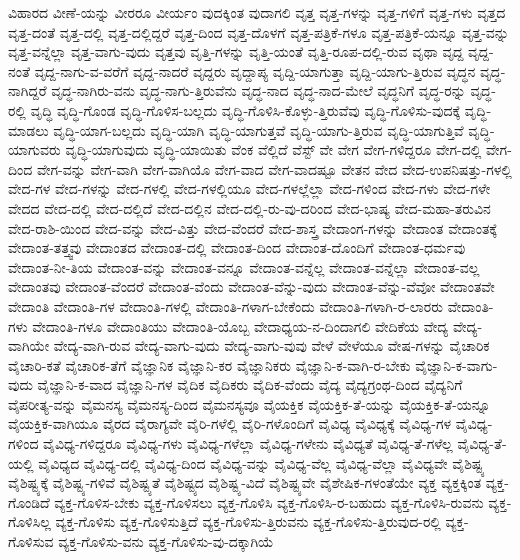 {ವಿಹಾರದ
ವೀಣೆ-ಯನ್ನು
ವೀರರೂ
ವೀರ್ಯಂ
ವುದಕ್ಕಿಂತ
ವುದಾಗಲಿ
ವೃತ್ತ
ವೃತ್ತ-ಗಳನ್ನು
ವೃತ್ತ-ಗಳಿಗೆ
ವೃತ್ತ-ಗಳು
ವೃತ್ತದ
ವೃತ್ತ-ದಂತೆ
ವೃತ್ತ-ದಲ್ಲಿ
ವೃತ್ತ-ದಲ್ಲಿದ್ದರೆ
ವೃತ್ತ-ದಿಂದ
ವೃತ್ತ-ದೊಳಗೆ
ವೃತ್ತ-ಪತ್ರಿಕೆ-ಗಳೂ
ವೃತ್ತ-ಪತ್ರಿಕೆ-ಯನ್ನೂ
ವೃತ್ತ-ವನ್ನು
ವೃತ್ತ-ವನ್ನೆಲ್ಲಾ
ವೃತ್ತ-ವಾಗು-ವುದು
ವೃತ್ತವು
ವೃತ್ತಿ-ಗಳನ್ನು
ವೃತ್ತಿ-ಯಂತೆ
ವೃತ್ತಿ-ರೂಪ-ದಲ್ಲಿ-ರುವ
ವೃಥಾ
ವೃದ್ದ
ವೃದ್ದ-ನಂತೆ
ವೃದ್ದ-ನಾಗು-ವ-ವರೆಗೆ
ವೃದ್ದ-ನಾದರೆ
ವೃದ್ದರು
ವೃದ್ದಾಪ್ಯ
ವೃದ್ದಿ-ಯಾಗುತ್ತಾ
ವೃದ್ದಿ-ಯಾಗು-ತ್ತಿರುವ
ವೃದ್ಧನ
ವೃದ್ಧ-ನಾಗಿದ್ದರೆ
ವೃದ್ಧ-ನಾಗಿರು-ವನು
ವೃದ್ಧ-ನಾಗು-ತ್ತಿರುವೆನು
ವೃದ್ಧ-ನಾದ
ವೃದ್ಧ-ನಾದ-ಮೇಲೆ
ವೃದ್ಧನಿಗೆ
ವೃದ್ಧ-ರನ್ನು
ವೃದ್ಧ-ರಲ್ಲಿ
ವೃದ್ಧಿ
ವೃದ್ಧಿ-ಗೊಂಡ
ವೃದ್ಧಿ-ಗೊಳಿಸ-ಬಲ್ಲದು
ವೃದ್ಧಿ-ಗೊಳಿಸಿ-ಕೊಳ್ಳು-ತ್ತಿರುವೆವು
ವೃದ್ಧಿ-ಗೊಳಿಸು-ವುದಕ್ಕೆ
ವೃದ್ಧಿ-ಮಾಡಲು
ವೃದ್ಧಿ-ಯಾಗ-ಬಲ್ಲದು
ವೃದ್ಧಿ-ಯಾಗಿ
ವೃದ್ಧಿ-ಯಾಗುತ್ತವೆ
ವೃದ್ಧಿ-ಯಾಗು-ತ್ತಿರುವ
ವೃದ್ಧಿ-ಯಾಗುತ್ತಿವೆ
ವೃದ್ಧಿ-ಯಾಗುವರು
ವೃದ್ಧಿ-ಯಾಗುವುದು
ವೃದ್ಧಿ-ಯಾಯಿತು
ವೆಂಕ
ವೆಲ್ಲಿದೆ
ವೆಸ್ಟ್
ವೇ
ವೇಗ
ವೇಗ-ಗಳಿದ್ದರೂ
ವೇಗ-ದಲ್ಲಿ
ವೇಗ-ದಿಂದ
ವೇಗ-ವನ್ನು
ವೇಗ-ವಾಗಿ
ವೇಗ-ವಾಗಿಯೊ
ವೇಗ-ವಾದ
ವೇಗ-ವಾದಷ್ಟೂ
ವೇತನ
ವೇದ
ವೇದ-ಉಪನಿಷತ್ತು-ಗಳಲ್ಲಿ
ವೇದ-ಗಳ
ವೇದ-ಗಳನ್ನು
ವೇದ-ಗಳಲ್ಲಿ
ವೇದ-ಗಳಲ್ಲಿಯೂ
ವೇದ-ಗಳಲ್ಲೆಲ್ಲಾ
ವೇದ-ಗಳಿಂದ
ವೇದ-ಗಳು
ವೇದ-ಗಳೇ
ವೇದದ
ವೇದ-ದಲ್ಲಿ
ವೇದ-ದಲ್ಲಿದೆ
ವೇದ-ದಲ್ಲಿನ
ವೇದ-ದಲ್ಲಿ-ರು-ವು-ದರಿಂದ
ವೇದ-ಭಾಷ್ಯ
ವೇದ-ಮಹಾ-ತರುವಿನ
ವೇದ-ರಾಶಿ-ಯಿಂದ
ವೇದ-ವನ್ನು
ವೇದ-ವಿತ್ತು
ವೇದ-ವೆಂದರೆ
ವೇದ-ಶಾಸ್ತ್ರ
ವೇದಾಂಗ-ಗಳನ್ನು
ವೇದಾಂತ
ವೇದಾಂತಕ್ಕೆ
ವೇದಾಂತ-ತತ್ತ್ವವು
ವೇದಾಂತದ
ವೇದಾಂತ-ದಲ್ಲಿ
ವೇದಾಂತ-ದಿಂದ
ವೇದಾಂತ-ದೊಂದಿಗೆ
ವೇದಾಂತ-ಧರ್ಮವು
ವೇದಾಂತ-ನೀ-ತಿಯ
ವೇದಾಂತ-ವನ್ನು
ವೇದಾಂತ-ವನ್ನೂ
ವೇದಾಂತ-ವನ್ನೆಲ್ಲ
ವೇದಾಂತ-ವನ್ನೆಲ್ಲಾ
ವೇದಾಂತ-ವಲ್ಲ
ವೇದಾಂತವು
ವೇದಾಂತ-ವೆಂದರೆ
ವೇದಾಂತ-ವೆಂದು
ವೇದಾಂತ-ವೆನ್ನು-ವುದು
ವೇದಾಂತ-ವೆನ್ನು-ವೆವೋ
ವೇದಾಂತವೇ
ವೇದಾಂತಿ
ವೇದಾಂತಿ-ಗಳ
ವೇದಾಂತಿ-ಗಳಲ್ಲಿ
ವೇದಾಂತಿ-ಗಳಾಗ-ಬೇಕೆಂದು
ವೇದಾಂತಿ-ಗಳಾಗಿ-ರ-ಲಾರರು
ವೇದಾಂತಿ-ಗಳು
ವೇದಾಂತಿ-ಗಳೂ
ವೇದಾಂತಿಯು
ವೇದಾಂತಿ-ಯೊಬ್ಬ
ವೇದಾಧ್ಯಯ-ನ-ದಿಂದಾಗಲಿ
ವೇದಿಕೆಯ
ವೇದ್ಯ
ವೇದ್ಯ-ವಾಗಿಯೇ
ವೇದ್ಯ-ವಾಗಿ-ರುವ
ವೇದ್ಯ-ವಾಗು-ವುದು
ವೇದ್ಯ-ವಾಗು-ವುವು
ವೇಳೆ
ವೇಳೆಯೂ
ವೇಷ-ಗಳನ್ನು
ವೈಚಾರಿಕ
ವೈಚಾರಿ-ಕತೆ
ವೈಚಾರಿಕ-ತೆಗೆ
ವೈಜ್ಞಾನಿಕ
ವೈಜ್ಞಾನಿ-ಕರ
ವೈಜ್ಞಾನಿಕರು
ವೈಜ್ಞಾನಿ-ಕ-ವಾಗಿ-ರ-ಬೇಕು
ವೈಜ್ಞಾನಿ-ಕ-ವಾಗು-ವುದು
ವೈಜ್ಞಾನಿ-ಕ-ವಾದ
ವೈಜ್ಞಾನಿ-ಗಳ
ವೈದಿಕ
ವೈದಿಕರು
ವೈದಿಕ-ವೆಂದು
ವೈದ್ಯ
ವೈದ್ಯಗ್ರಂಥ-ದಿಂದ
ವೈದ್ಯನಿಗೆ
ವೈಪರೀತ್ಯ-ವನ್ನು
ವೈಮನಸ್ಯ
ವೈಮನಸ್ಯ-ದಿಂದ
ವೈಮನಸ್ಯವೂ
ವೈಯಕ್ತಿಕ
ವೈಯಕ್ತಿಕ-ತೆ-ಯನ್ನು
ವೈಯಕ್ತಿಕ-ತೆ-ಯನ್ನೂ
ವೈಯಕ್ತಿಕ-ವಾಗಿಯೂ
ವೈರದ
ವೈರಾಗ್ಯವೇ
ವೈರಿ-ಗಳೆಲ್ಲಿ
ವೈರಿ-ಗಳೊಂದಿಗೆ
ವೈವಿಧ್ಯ
ವೈವಿಧ್ಯಕ್ಕೆ
ವೈವಿಧ್ಯ-ಗಳ
ವೈವಿಧ್ಯ-ಗಳಿಂದ
ವೈವಿಧ್ಯ-ಗಳಿದ್ದರೂ
ವೈವಿಧ್ಯ-ಗಳು
ವೈವಿಧ್ಯ-ಗಳೆಲ್ಲಾ
ವೈವಿಧ್ಯ-ಗಳೇನು
ವೈವಿಧ್ಯತೆ
ವೈವಿಧ್ಯ-ತೆ-ಗಳೆಲ್ಲ
ವೈವಿಧ್ಯ-ತೆ-ಯಲ್ಲಿ
ವೈವಿಧ್ಯದ
ವೈವಿಧ್ಯ-ದಲ್ಲಿ
ವೈವಿಧ್ಯ-ದಿಂದ
ವೈವಿಧ್ಯ-ವನ್ನು
ವೈವಿಧ್ಯ-ವೆಲ್ಲ
ವೈವಿಧ್ಯ-ವೆಲ್ಲಾ
ವೈವಿಧ್ಯವೇ
ವೈಶಿಷ್ಟ್ಯ
ವೈಶಿಷ್ಟ್ಯಕ್ಕೆ
ವೈಶಿಷ್ಟ್ಯ-ಗಳಿವೆ
ವೈಶಿಷ್ಟ್ಯತೆ
ವೈಶಿಷ್ಟ್ಯದ
ವೈಶಿಷ್ಟ್ಯ-ವಿದೆ
ವೈಶಿಷ್ಟ್ಯವೇ
ವೈಶೇಷಿಕ-ಗಳಂತೆಯೇ
ವ್ಯಕ್ತ
ವ್ಯಕ್ತಕ್ಕಿಂತ
ವ್ಯಕ್ತ-ಗೊಂಡಿದೆ
ವ್ಯಕ್ತ-ಗೊಳಿಸ-ಬೇಕು
ವ್ಯಕ್ತ-ಗೊಳಿಸಲು
ವ್ಯಕ್ತ-ಗೊಳಿಸಿ
ವ್ಯಕ್ತ-ಗೊಳಿಸಿ-ರ-ಬಹುದು
ವ್ಯಕ್ತ-ಗೊಳಿಸಿ-ರುವನು
ವ್ಯಕ್ತ-ಗೊಳಿಸಿಲ್ಲ
ವ್ಯಕ್ತ-ಗೊಳಿಸು
ವ್ಯಕ್ತ-ಗೊಳಿಸುತ್ತಿದೆ
ವ್ಯಕ್ತ-ಗೊಳಿಸು-ತ್ತಿರುವನು
ವ್ಯಕ್ತ-ಗೊಳಿಸು-ತ್ತಿರುವುದ-ರಲ್ಲಿ
ವ್ಯಕ್ತ-ಗೊಳಿಸುವ
ವ್ಯಕ್ತ-ಗೊಳಿಸು-ವನು
ವ್ಯಕ್ತ-ಗೊಳಿಸು-ವು-ದಕ್ಕಾಗಿಯೆ
}
